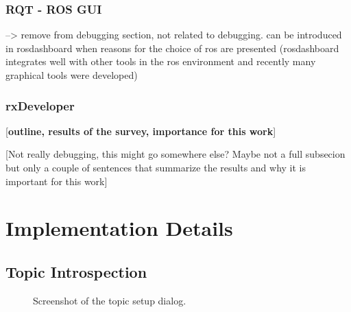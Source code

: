 \subsubsection{RQT - ROS GUI}
--> remove from debugging section, not related to debugging. can be introduced in rosdashboard when reasons for the choice of ros are presented (rosdashboard integrates well with other tools in the ros environment and recently many graphical tools were developed)

\subsubsection{rxDeveloper}
[\textbf{outline, results of the survey, importance for this work}]
\cite{Muellers2012}

[Not really debugging, this might go somewhere else? Maybe not a full subsecion but only a couple of sentences that summarize the results and why it is important for this work]

\section{Implementation Details}

\subsection{Topic Introspection}

\begin{figure}[thpb]
  \centering
  \caption{Screenshot of the topic setup dialog.}
  \label{topic setup screenshot}
\end{figure}

